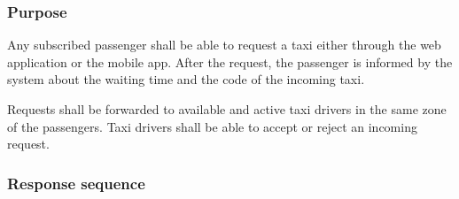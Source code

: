 \label{standard-call}
\subsubsection{Purpose}

Any subscribed passenger shall be able to request a taxi either through the web application or the mobile app.
After the request, the passenger is informed by the system about the waiting time and the code of the incoming taxi.

Requests shall be forwarded to available and active taxi drivers in the same zone of the passengers. Taxi drivers shall be able to accept or reject an incoming request.

\subsubsection{Response sequence}

